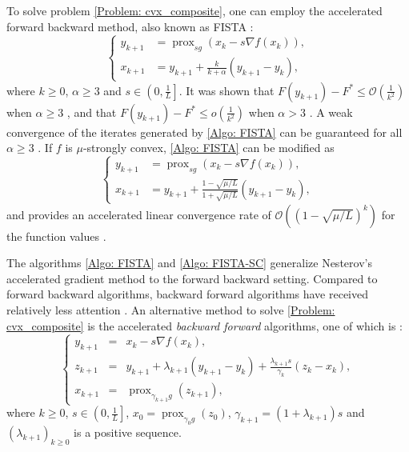 \documentclass[pdflatex,sn-mathphys-num]{sn-jnl}
\theoremstyle{thmstyleone}
\theoremstyle{thmstyletwo}
\theoremstyle{thmstylethree}
\DeclareMathOperator{\prox}{prox}
\begin{document}
To solve problem \eqref{Problem: cvx_composite}, one can employ the accelerated forward backward method, also known as FISTA \cite{Beck_2009}:
\begin{equation}\label{Algo: FISTA}\tag{FISTA}
\left\{
\begin{aligned}
y_{k+1} &= \prox_{sg}\left( x_k - s\nabla f(x_k) \right),\\
x_{k+1} &= y_{k+1} + \frac{k}{k+\alpha}(y_{k+1}-y_k),
\end{aligned}
\right.
\end{equation}   
where $k\ge 0$, $\alpha\ge 3$ and $s\in\left( 0,\frac{1}{L} \right]$. It was shown that $F(y_{k+1}) - F^* \le \mathcal{O}\left( \frac{1}{k^2} \right)$ when $\alpha\ge 3$ \cite{Beck_2009}, and that $F(y_{k+1}) - F^* \le o\left( \frac{1}{k^2} \right)$ when $\alpha>3$ \cite{Attouch_2016}. A weak convergence of the iterates generated by \eqref{Algo: FISTA} can be guaranteed for all $\alpha\ge 3$ \cite{Chambolle_2015,Attouch_2018,Ryu_2025,Radu_2025_iterate,Bauschke_2026}. If $f$ is $\mu$-strongly convex, \eqref{Algo: FISTA} can be modified as \cite{Beck_2017}
\begin{equation}\label{Algo: FISTA-SC}\tag{FISTA-SC}
\left\{
\begin{aligned}
y_{k+1} &= \prox_{sg}\left( x_k - s\nabla f(x_k) \right),\\
x_{k+1} &= y_{k+1} + \frac{1-\sqrt{\mu/L}}{1+\sqrt{\mu/L}}(y_{k+1}-y_k),
\end{aligned}
\right.
\end{equation}
and provides an accelerated linear convergence rate of $\mathcal{O}\left( (1-\sqrt{\mu/L})^k \right)$ for the function values \cite{Beck_2017}. 

The algorithms \eqref{Algo: FISTA} and \eqref{Algo: FISTA-SC} generalize Nesterov's accelerated gradient method \cite{Nesterov_1983,Nesterov_2004} to the forward backward setting. Compared to forward backward algorithms, backward forward algorithms have received relatively less attention \cite{Attouch_2018_BF}. An alternative method to solve \eqref{Problem: cvx_composite} is the accelerated {\it backward forward} algorithms, one of which is \cite[Algorithm FPGM2]{Taylor_2017}:
\begin{equation}\label{Algo: APM}\tag{ABF}
\left\{
\begin{array}{rcl}
y_{k+1} &=& x_k - s \nabla f(x_k), \\[3pt]
z_{k+1} &=& y_{k+1} + \lambda_{k+1} ( y_{k+1} - y_k ) + \frac{\lambda_{k+1}s}{\gamma_k}( z_k - x_k ),\\[3pt]
x_{k+1} &=& \prox_{ \gamma_{k+1} g }(z_{k+1}),
\end{array} 
\right.
\end{equation}
where $k\ge 0$, $s\in\left( 0,\frac{1}{L} \right]$, $x_0=\prox_{\gamma_0 g}(z_0)$, $\gamma_{k+1}=(1 + \lambda_{k+1})s$ and $(\lambda_{k+1})_{k \ge 0}$ is a positive sequence. 
\end{document}
